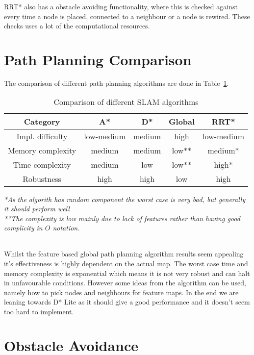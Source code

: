 \documentclass[12pt, a4paper, onecolumn]{article}
\begin{document}
RRT* also has a obstacle avoiding functionality, where this is checked against every time a node is placed, connected to a neighbour or a node is rewired.
These checks uses a lot of the computational resources. \cite{RRT19}

\section{Path Planning Comparison}
The comparison of different path planning algorithms are done in 
Table~\ref{tab:path_algorithms}.
\begin{table}[h!]
  \begin{center}
    \begin{tabular}[c]{|c || c c c c |}
      \hline
       Category        &  A*            & D*      & Global & RRT*    \\
      \hline
      Impl. difficulty & low-medium     & medium  & high   & low-medium \\
      \hline
      Memory complexity & medium        & medium  & low**  & medium* \\
      \hline
      Time complexity  & medium         & low     & low**  & high* \\
      \hline
      Robustness       & high           & high    & low    & high \\
      \hline
    \end{tabular}
  \end{center}
  \textit{\small{*As the algorith has random component the worst case is very bad, but generally it should perform well}}\\
  \textit{\small{**The complexity is low mainly due to lack of features rather than having good complicity in $O$ notation.}}
  \caption{Comparison of different SLAM algorithms}
  \label{tab:path_algorithms}
\end{table} \\


Whilst the feature based global path planning algorithm results seem appealing it's effectiveness is highly dependent on the actual map.
The worst case time and memory complexity is exponential which means it is not very robust and can halt in unfavourable conditions.
However some ideas from the algorithm can be used, namely how to pick nodes and neighbours for feature maps.
In the end we are leaning towards D* Lite as it should give a good performance and it doesn't seem too hard to implement.

\section{Obstacle Avoidance }
\end{document}
